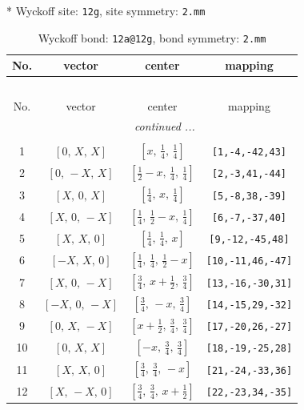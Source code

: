 \documentclass[fleqn,8pt]{jsarticle}
\begin{document}
* Wyckoff site: {\tt 12g}, site symmetry: {\tt 2.mm}
\renewcommand{\arraystretch}{1.2}
\begin{longtable}{cccc}
\caption{Wyckoff bond: {\tt 12a@12g}, bond symmetry: {\tt 2.mm}}
 \\
 \hline \hline
No. & vector & center & mapping \\ \hline \endfirsthead

\multicolumn{3}{l}{\tablename\ \thetable{}} \\
 \hline \hline
No. & vector & center & mapping \\ \hline \endhead

 \hline \hline
\multicolumn{3}{r}{\footnotesize\it continued ...} \\ \endfoot

 \hline \hline
\multicolumn{3}{r}{} \\ \endlastfoot

1 & $\left[ 0,\, X,\, X \right]$ & $\left[ x,\, \frac{1}{4},\, \frac{1}{4} \right]$ & {\tt [1,-4,-42,43]} \\ \hline
2 & $\left[ 0,\, - X,\, X \right]$ & $\left[ \frac{1}{2} - x,\, \frac{1}{4},\, \frac{1}{4} \right]$ & {\tt [2,-3,41,-44]} \\ \hline
3 & $\left[ X,\, 0,\, X \right]$ & $\left[ \frac{1}{4},\, x,\, \frac{1}{4} \right]$ & {\tt [5,-8,38,-39]} \\ \hline
4 & $\left[ X,\, 0,\, - X \right]$ & $\left[ \frac{1}{4},\, \frac{1}{2} - x,\, \frac{1}{4} \right]$ & {\tt [6,-7,-37,40]} \\ \hline
5 & $\left[ X,\, X,\, 0 \right]$ & $\left[ \frac{1}{4},\, \frac{1}{4},\, x \right]$ & {\tt [9,-12,-45,48]} \\ \hline
6 & $\left[ - X,\, X,\, 0 \right]$ & $\left[ \frac{1}{4},\, \frac{1}{4},\, \frac{1}{2} - x \right]$ & {\tt [10,-11,46,-47]} \\ \hline
7 & $\left[ X,\, 0,\, - X \right]$ & $\left[ \frac{3}{4},\, x + \frac{1}{2},\, \frac{3}{4} \right]$ & {\tt [13,-16,-30,31]} \\ \hline
8 & $\left[ - X,\, 0,\, - X \right]$ & $\left[ \frac{3}{4},\, - x,\, \frac{3}{4} \right]$ & {\tt [14,-15,29,-32]} \\ \hline
9 & $\left[ 0,\, X,\, - X \right]$ & $\left[ x + \frac{1}{2},\, \frac{3}{4},\, \frac{3}{4} \right]$ & {\tt [17,-20,26,-27]} \\ \hline
10 & $\left[ 0,\, X,\, X \right]$ & $\left[ - x,\, \frac{3}{4},\, \frac{3}{4} \right]$ & {\tt [18,-19,-25,28]} \\ \hline
11 & $\left[ X,\, X,\, 0 \right]$ & $\left[ \frac{3}{4},\, \frac{3}{4},\, - x \right]$ & {\tt [21,-24,-33,36]} \\ \hline
12 & $\left[ X,\, - X,\, 0 \right]$ & $\left[ \frac{3}{4},\, \frac{3}{4},\, x + \frac{1}{2} \right]$ & {\tt [22,-23,34,-35]} \\
\end{longtable}
\end{document}
